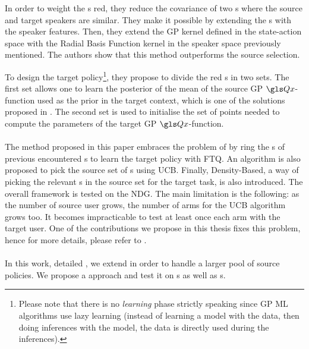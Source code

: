 In order to weight the s red, they reduce the covariance of two s where the source and target speakers are similar. They make it possible by extending the s with the speaker features. Then, they extend the \gls{GP} kernel defined in the state-action space with the Radial Basis Function kernel in the speaker space previously mentioned. The authors show that this method outperforms the source selection.

To design the target policy\footnote{Please note that there is no \textit{learning} phase strictly speaking since \gls{GP} \gls{ML} algorithms use lazy learning (instead of learning a model with the data, then doing inferences with the model, the data is directly used during the inferences).}, they propose to divide the red s in two sets. The first set allows one to learn the posterior of the mean of the source \gls{GP} $\Q$-function used as the prior in the target context, which is one of the solutions proposed in \textcite{Gasic2013}. The second set is used to initialise the set of points needed to compute the parameters of the target \gls{GP} $\Q$-function.

\paragraph{\cite{Genevay2016}} The method proposed in this paper embraces the problem of   by ring the s of previous encountered s to learn the target policy with \gls{FTQ}. An algorithm is also proposed to pick the source set of s using \gls{UCB}. Finally, Density-Based, a way of picking the relevant s in the source set for the target task, is also introduced. The overall framework is tested on the \acrfull{NDG}. The main limitation is the following: as the number of source user grows, the number of arms for the UCB algorithm grows too. It becomes impracticable to test at least once each arm with the target user. One of the contributions we propose in this thesis fixes this problem, hence for more details, please refer to .

\paragraph{\cite{carrara2017online}} In this work, detailed , we extend \textcite{Genevay2016} in order to handle a larger pool of source policies. We propose a  approach and test it on s as well as s.


